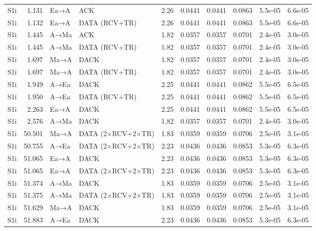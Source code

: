 \documentclass[10pt,letterpaper]{article}
\begin{document}
{\begin{longtable}{@{}lrllrrrrrr@{}}
S1i & 1.131 & Ea→A & ACK & 2.26 & 0.0441 & 0.0441 & 0.0863 & 5.5e-05 & 6.6e-05 \\
S1i & 1.132 & Ea→A & DATA (RCV+TR) & 2.26 & 0.0441 & 0.0441 & 0.0863 & 5.5e-05 & 6.6e-05 \\
S1i & 1.445 & A→Ma & ACK & 1.82 & 0.0357 & 0.0357 & 0.0701 & 2.4e-05 & 3.0e-05 \\
S1i & 1.445 & A→Ma & DATA (RCV+TR) & 1.82 & 0.0357 & 0.0357 & 0.0701 & 2.4e-05 & 3.0e-05 \\
S1i & 1.697 & Ma→A & DACK & 1.82 & 0.0357 & 0.0357 & 0.0701 & 2.4e-05 & 3.0e-05 \\
S1i & 1.697 & Ma→A & DATA (RCV+TR) & 1.82 & 0.0357 & 0.0357 & 0.0701 & 2.4e-05 & 3.0e-05 \\
S1i & 1.949 & A→Ea & DACK & 2.25 & 0.0441 & 0.0441 & 0.0862 & 5.5e-05 & 6.5e-05 \\
S1i & 1.950 & A→Ea & DATA (RCV+TR) & 2.25 & 0.0441 & 0.0441 & 0.0862 & 5.5e-05 & 6.5e-05 \\
S1i & 2.263 & Ea→A & DACK & 2.25 & 0.0441 & 0.0441 & 0.0862 & 5.5e-05 & 6.5e-05 \\
S1i & 2.576 & A→Ma & DACK & 1.82 & 0.0357 & 0.0357 & 0.0701 & 2.4e-05 & 3.0e-05 \\
S1i & 50.501 & Ma→A & DATA (2×RCV+2×TR) & 1.83 & 0.0359 & 0.0359 & 0.0706 & 2.5e-05 & 3.1e-05 \\
S1i & 50.755 & A→Ea & DATA (2×RCV+2×TR) & 2.23 & 0.0436 & 0.0436 & 0.0853 & 5.3e-05 & 6.3e-05 \\
S1i & 51.065 & Ea→A & DACK & 2.23 & 0.0436 & 0.0436 & 0.0853 & 5.3e-05 & 6.3e-05 \\
S1i & 51.065 & Ea→A & DATA (2×RCV+2×TR) & 2.23 & 0.0436 & 0.0436 & 0.0853 & 5.3e-05 & 6.3e-05 \\
S1i & 51.374 & A→Ma & DACK & 1.83 & 0.0359 & 0.0359 & 0.0706 & 2.5e-05 & 3.1e-05 \\
S1i & 51.375 & A→Ma & DATA (2×RCV+2×TR) & 1.83 & 0.0359 & 0.0359 & 0.0706 & 2.5e-05 & 3.1e-05 \\
S1i & 51.629 & Ma→A & DACK & 1.83 & 0.0359 & 0.0359 & 0.0706 & 2.5e-05 & 3.1e-05 \\
S1i & 51.883 & A→Ea & DACK & 2.23 & 0.0436 & 0.0436 & 0.0853 & 5.3e-05 & 6.3e-05 \\
\end{longtable}}
\end{document}
